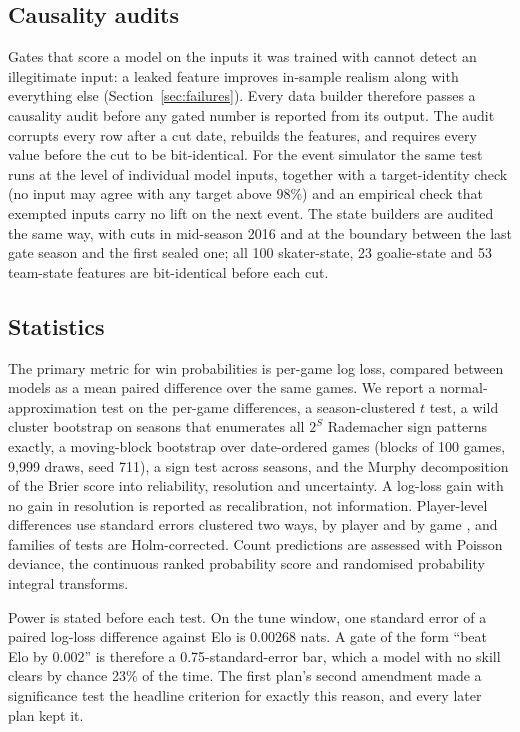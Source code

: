 \subsection{Causality audits}

Gates that score a model on the inputs it was trained with cannot detect an
illegitimate input: a leaked feature improves in-sample realism along with
everything else (Section~\ref{sec:failures}). Every data builder therefore
passes a causality audit before any gated number is reported from its output.
The audit corrupts every row after a cut date, rebuilds the features, and
requires every value before the cut to be bit-identical. For the event
simulator the same test runs at the level of individual model inputs, together
with a target-identity check (no input may agree with any target above 98\%)
and an empirical check that exempted inputs carry no lift on the next event.
The \neurhlG{} state builders are audited the same way, with cuts in mid-season
2016 and at the boundary between the last gate season and the first sealed
one; all 100 skater-state, 23 goalie-state and 53 team-state features are
bit-identical before each cut.

\subsection{Statistics}

The primary metric for win probabilities is per-game log loss, compared
between models as a mean paired difference over the same games. We report a
normal-approximation test on the per-game differences, a season-clustered $t$
test, a wild cluster bootstrap on seasons that enumerates all $2^S$
Rademacher sign patterns exactly, a moving-block bootstrap over date-ordered
games (blocks of 100 games, 9,999 draws, seed 711), a sign test across
seasons, and the Murphy decomposition of the Brier score into reliability,
resolution and uncertainty. A log-loss gain with no gain in resolution is
reported as recalibration, not information. Player-level differences use
standard errors clustered two ways, by player and by game
\citep{cameron2011robust}, and families of tests are Holm-corrected. Count
predictions are assessed with Poisson deviance, the continuous ranked
probability score and randomised probability integral transforms.

Power is stated before each test. On the tune window, one standard error of a
paired log-loss difference against Elo is 0.00268 nats. A gate of the form
``beat Elo by 0.002'' is therefore a 0.75-standard-error bar, which a model
with no skill clears by chance 23\% of the time. The first plan's second
amendment made a significance test the headline criterion for exactly this
reason, and every later plan kept it.
